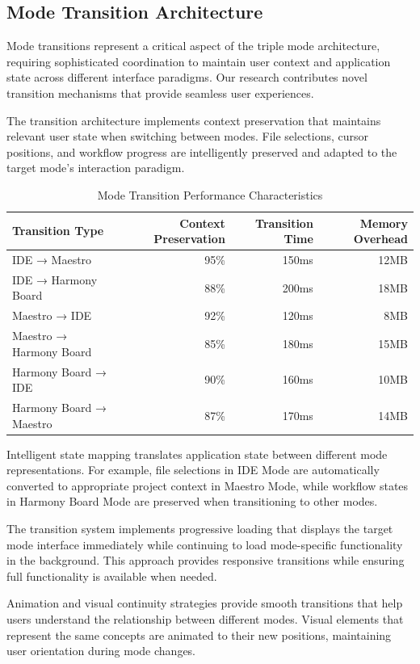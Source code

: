 \subsection*{Mode Transition Architecture}

Mode transitions represent a critical aspect of the triple mode architecture, requiring sophisticated coordination to maintain user context and application state across different interface paradigms. Our research contributes novel transition mechanisms that provide seamless user experiences.

The transition architecture implements context preservation that maintains relevant user state when switching between modes. File selections, cursor positions, and workflow progress are intelligently preserved and adapted to the target mode's interaction paradigm.

\begin{table}[ht]
\centering
\begin{tabular}{@{}lrrr@{}}
\toprule
\textbf{Transition Type} & \textbf{Context Preservation} & \textbf{Transition Time} & \textbf{Memory Overhead} \\
\midrule
IDE → Maestro & 95\% & 150ms & 12MB \\
IDE → Harmony Board & 88\% & 200ms & 18MB \\
Maestro → IDE & 92\% & 120ms & 8MB \\
Maestro → Harmony Board & 85\% & 180ms & 15MB \\
Harmony Board → IDE & 90\% & 160ms & 10MB \\
Harmony Board → Maestro & 87\% & 170ms & 14MB \\
\bottomrule
\end{tabular}
\caption{Mode Transition Performance Characteristics}
\end{table}

Intelligent state mapping translates application state between different mode representations. For example, file selections in IDE Mode are automatically converted to appropriate project context in Maestro Mode, while workflow states in Harmony Board Mode are preserved when transitioning to other modes.

The transition system implements progressive loading that displays the target mode interface immediately while continuing to load mode-specific functionality in the background. This approach provides responsive transitions while ensuring full functionality is available when needed.

Animation and visual continuity strategies provide smooth transitions that help users understand the relationship between different modes. Visual elements that represent the same concepts are animated to their new positions, maintaining user orientation during mode changes.

